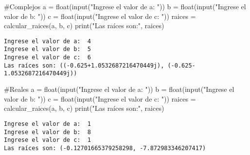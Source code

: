 \documentclass[
  letterpaper,
  DIV=11,
  numbers=noendperiod]{scrartcl}
\newenvironment{Shaded}{\begin{snugshade}}{\end{snugshade}}
\newcommand{\BuiltInTok}[1]{\textcolor[rgb]{0.00,0.23,0.31}{#1}}
\newcommand{\CommentTok}[1]{\textcolor[rgb]{0.37,0.37,0.37}{#1}}
\newcommand{\NormalTok}[1]{\textcolor[rgb]{0.00,0.23,0.31}{#1}}
\newcommand{\OperatorTok}[1]{\textcolor[rgb]{0.37,0.37,0.37}{#1}}
\newcommand{\StringTok}[1]{\textcolor[rgb]{0.13,0.47,0.30}{#1}}
\begin{document}
\begin{Shaded}
\begin{Highlighting}[]
\CommentTok{\#Complejos}
\NormalTok{a }\OperatorTok{=} \BuiltInTok{float}\NormalTok{(}\BuiltInTok{input}\NormalTok{(}\StringTok{"Ingrese el valor de a: "}\NormalTok{))}
\NormalTok{b }\OperatorTok{=} \BuiltInTok{float}\NormalTok{(}\BuiltInTok{input}\NormalTok{(}\StringTok{"Ingrese el valor de b: "}\NormalTok{))}
\NormalTok{c }\OperatorTok{=} \BuiltInTok{float}\NormalTok{(}\BuiltInTok{input}\NormalTok{(}\StringTok{"Ingrese el valor de c: "}\NormalTok{))}
\NormalTok{raices }\OperatorTok{=}\NormalTok{ calcular\_raices(a, b, c)}
\BuiltInTok{print}\NormalTok{(}\StringTok{"Las raíces son:"}\NormalTok{, raices)}
\end{Highlighting}
\end{Shaded}

\begin{verbatim}
Ingrese el valor de a:  4
Ingrese el valor de b:  5
Ingrese el valor de c:  6
Las raíces son: ((-0.625+1.0532687216470449j), (-0.625-1.0532687216470449j))
\end{verbatim}

\begin{Shaded}
\begin{Highlighting}[]
\CommentTok{\#Reales}
\NormalTok{a }\OperatorTok{=} \BuiltInTok{float}\NormalTok{(}\BuiltInTok{input}\NormalTok{(}\StringTok{"Ingrese el valor de a: "}\NormalTok{))}
\NormalTok{b }\OperatorTok{=} \BuiltInTok{float}\NormalTok{(}\BuiltInTok{input}\NormalTok{(}\StringTok{"Ingrese el valor de b: "}\NormalTok{))}
\NormalTok{c }\OperatorTok{=} \BuiltInTok{float}\NormalTok{(}\BuiltInTok{input}\NormalTok{(}\StringTok{"Ingrese el valor de c: "}\NormalTok{))}
\NormalTok{raices }\OperatorTok{=}\NormalTok{ calcular\_raices(a, b, c)}
\BuiltInTok{print}\NormalTok{(}\StringTok{"Las raíces son:"}\NormalTok{, raices)}
\end{Highlighting}
\end{Shaded}

\begin{verbatim}
Ingrese el valor de a:  1
Ingrese el valor de b:  8
Ingrese el valor de c:  1
Las raíces son: (-0.12701665379258298, -7.872983346207417)
\end{verbatim}
\end{document}
